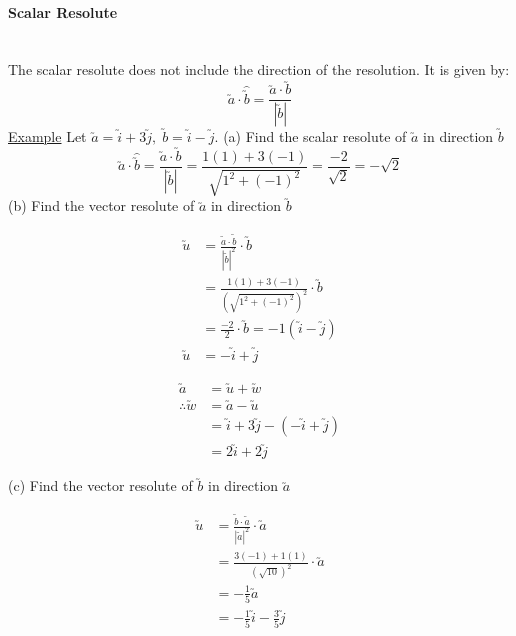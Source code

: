 \documentclass[a4paper]{article}
\begin{document}
				\paragraph{Scalar Resolute}\mbox{}\\
				The scalar resolute does not include the direction of the resolution. It is given by:
				\[
					\utilde{a}\cdot\hat{\utilde{b}}=\frac{\utilde{a}\cdot\utilde{b}}{|\utilde{b}|}
				\]
				\underline{Example}\newline
				Let $\utilde{a}=\utilde{i}+3\utilde{j},\;\utilde{b}=\utilde{i}-\utilde{j}$.\newline
				(a) Find the scalar resolute of $\utilde{a}$ in direction $\utilde{b}$\newline
				\[
					\utilde{a}\cdot\hat{\utilde{b}}=\frac{\utilde{a}\cdot\utilde{b}}{|\utilde{b}|}=\frac{1(1)+3(-1)}{\sqrt{1^2+(-1)^2}}=\frac{-2}{\sqrt{2}}=-\sqrt{2}
				\]
				(b) Find the vector resolute of $\utilde{a}$ in direction $\utilde{b}$\newline
				\begin{minipage}[t]{0.5\textwidth}
					\begin{align*}
						\utilde{u}&=\frac{\utilde{a}\cdot\utilde{b}}{|\utilde{b}|^2}\cdot\utilde{b} \\
						&=\frac{1(1)+3(-1)}{(\sqrt{1^2+(-1)^2})^2}\cdot\utilde{b} \\
						&=\frac{-2}{2}\cdot\utilde{b}=-1(\utilde{i}-\utilde{j}) \\
						\utilde{u}&=-\utilde{i}+\utilde{j}
					\end{align*}
				\end{minipage}
				\hfill
				\begin{minipage}[t]{0.5\textwidth}
					\begin{align*}
						\utilde{a}&=\utilde{u}+\utilde{w} \\
						\therefore\utilde{w}&=\utilde{a}-\utilde{u} \\
						&=\utilde{i}+3\utilde{j}-(-\utilde{i}+\utilde{j}) \\
						&=2\utilde{i}+2\utilde{j}
					\end{align*}
				\end{minipage}
				(c) Find the vector resolute of $\utilde{b}$ in direction $\utilde{a}$\newline
				\begin{minipage}[t]{0.5\textwidth}
					\begin{align*}
						\utilde{u}&=\frac{\utilde{b}\cdot\utilde{a}}{|\utilde{a}|^2}\cdot\utilde{a} \\
						&=\frac{3(-1)+1(1)}{(\sqrt{10})^2}\cdot\utilde{a} \\
						&=-\frac{1}{5}\utilde{a} \\
						&=-\frac{1}{5}\utilde{i}-\frac{3}{5}\utilde{j}
					\end{align*}
				\end{minipage}
\end{document}

